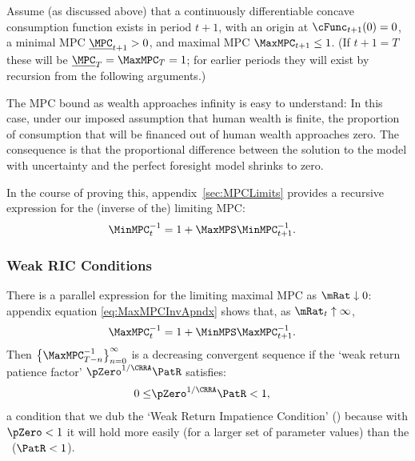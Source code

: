 \documentclass[BufferStockTheory]{subfiles}
\begin{document}
\newcommand{\NewMaxMinMPC}{\underline{\MPC}}

Assume (as discussed above) that a continuously differentiable
concave consumption function exists in period $t+1$, with an origin at
$\cFunc_{t+1}(0)=0$, a minimal MPC $\NewMaxMinMPC_{t+1}>0$, and
maximal MPC $\MaxMPC_{t+1} \leq 1$.  (If $t+1 = T$ these will be
$\NewMaxMinMPC_{T}=\MaxMPC_{T}=1$; for earlier periods they will exist
by recursion from the following arguments.)

The MPC bound as wealth approaches infinity is easy to understand: In this case,
under our imposed assumption that human wealth is finite, the proportion of consumption
that will be financed out of human wealth approaches zero. The
consequence is that the proportional difference between the solution to the
model with uncertainty and the perfect foresight model shrinks to zero.

\hypertarget{MPCnvrsLower}{}
\hypertarget{WRICCond}{}
In the course of proving this, appendix~\ref{sec:MPCLimits}  provides a recursive expression for the (inverse of the) limiting MPC: 
\begin{equation}\begin{gathered}\begin{aligned}
  \MinMPC_{t}^{-1}  & = 1+\MaxMPS \MinMPC_{t+1}^{-1} \label{eq:MinMPCInv}.
\end{aligned}\end{gathered}\end{equation}

\subsubsection{Weak RIC Conditions}{}
\hypertarget{MPCnvrsUpper}{}
\hypertarget{WRIC}{}
There is a parallel expression for the limiting maximal 
MPC as $\mRat \downarrow 0$: appendix equation \eqref{eq:MaxMPCInvApndx}  shows that, as $\mRat_{t} \uparrow \infty$,
\begin{equation}\begin{gathered}\begin{aligned}
  \MaxMPC_{t}^{-1}  & = 1+\MinMPS \MaxMPC_{t+1}^{-1} \label{eq:MaxMPCInv}.
\end{aligned}\end{gathered}\end{equation}
\hypertarget{WRIF}{}  
Then
$\left\{\MaxMPC_{T-n}^{-1}\right\} _{n=0}^{\infty}$ is a decreasing %
convergent sequence if the `weak return patience factor' $\pZero^{1/\CRRA}\PatR$ satisfies:
\begin{equation}\begin{gathered}\begin{aligned}
  0 \leq & \pZero^{1/\CRRA} \PatR < 1 \label{eq:WRIC},
\end{aligned}\end{gathered}\end{equation}
a condition that we dub the `Weak Return Impatience Condition' (\WRIC)
because with $\pZero < 1$ it will hold more easily (for a larger set of parameter
values) than the \RIC~($\PatR < 1$).
\end{document}
